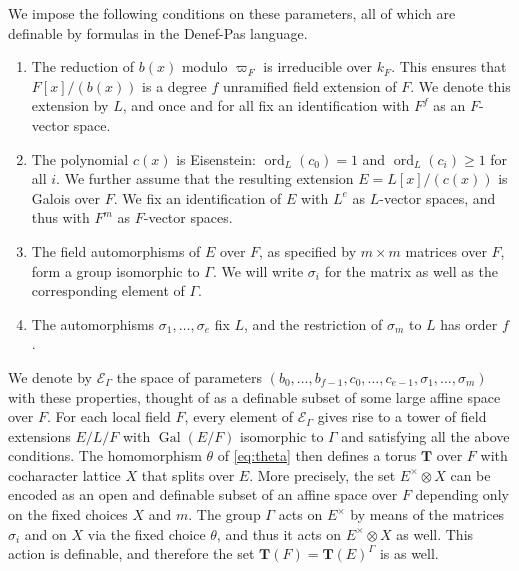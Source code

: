 \documentclass{amsart}
\DeclareMathOperator{\gal}{Gal}
\DeclareMathOperator{\ord}{ord}
\newcommand{\bT}{\mathbf {T}}
\newcommand\cE{{\mathcal E}}
\theoremstyle{plain}
\theoremstyle{definition}
\begin{document}
We impose the following conditions on these parameters, all of which are definable by formulas in the Denef-Pas language. 
\begin{enumerate}
\item The reduction of $b(x)$ modulo $\varpi_F$ is irreducible over $k_F$. 
This ensures that $F[x]/(b(x))$ is a degree $f$ unramified field extension of $F$. 
We denote this extension by $L$, and once and for all fix an identification with $F^f$ as 
an $F$-vector space. 
\item The polynomial $c(x)$ is Eisenstein: $\ord_L(c_0) = 1$ and $\ord_L(c_i) \ge 1$ for all $i$.
We further assume that the resulting extension $E = L[x]/(c(x))$ is Galois over $F$.
We fix an identification of $E$ with $L^e$ as $L$-vector spaces, and thus with $F^m$ as $F$-vector spaces. 
\item The field automorphisms of $E$ over $F$, as specified by $m \times m$ matrices over $F$, form a group isomorphic to $\Gamma$.
We will write $\sigma_i$ for the matrix as well as the corresponding element of $\Gamma$.
\item The automorphisms $\sigma_1, \dots, \sigma_e$ fix $L$, and the restriction of $\sigma_m$ to $L$ has order $f$.
\end{enumerate}
We denote by $\cE_\Gamma$ the space of parameters $(b_0, \dots, b_{f-1}, c_0, \dots, c_{e-1}, \sigma_1, \dots, \sigma_m)$ with these properties,
thought of as a definable subset of some large affine space over $F$.
For each local field $F$, every element of $\cE_\Gamma$ gives rise to a tower of field extensions $E/L/F$
with $\gal(E/F)$ isomorphic to $\Gamma$ and satisfying all the above conditions.
The homomorphism $\theta$ of \eqref{eq:theta} then defines a torus $\bT$ over $F$ with cocharacter lattice $X$ that splits over $E$.
More precisely, the set $E^\times \otimes X$ can be encoded as an open and definable subset
of an affine space over $F$ depending only on the fixed choices $X$ and $m$.
The group $\Gamma$ acts on $E^\times$ by means of the matrices $\sigma_i$ and on $X$
via the fixed choice $\theta$, and thus it acts on $E^\times \otimes X$ as well. 
This action is definable, and therefore the set $\bT(F) = \bT(E)^\Gamma$ is as well.
\end{document}
